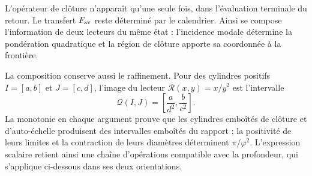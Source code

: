 L'opérateur de clôture n'apparaît qu'une seule fois, dans l'évaluation terminale du retour. Le transfert \(F_{\rm av}\) reste déterminé par le calendrier. Ainsi se compose l'information de deux lecteurs du même état : l'incidence modale détermine la pondération quadratique et la région de clôture apporte sa coordonnée à la frontière.

La composition conserve aussi le raffinement. Pour des cylindres positifs
\(I=[a,b]\) et \(J=[c,d]\), l'image du lecteur
\(\mathcal R(x,y)=x/y^2\) est l'intervalle
\[
 \mathcal Q(I,J)=\left[\frac{a}{d^2},\frac{b}{c^2}\right].
\]
La monotonie en chaque argument prouve que les cylindres emboîtés de
clôture et d'auto-échelle produisent des intervalles emboîtés du rapport ; la
positivité de leurs limites et la contraction de leurs diamètres déterminent
\(\pi/\varphi^2\). L'expression scalaire retient ainsi une chaîne
d'opérations compatible avec la profondeur, qui s'applique
ci-dessous dans ses deux orientations.

